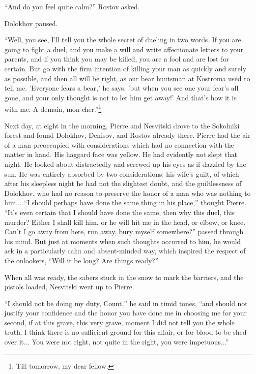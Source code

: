 ``And do you feel quite calm?'' Rostov asked.

Dolokhov paused.

``Well, you see, I'll tell you the whole secret of dueling in two
words.  If you are going to fight a duel, and you make a will and
write affectionate letters to your parents, and if you think you
may be killed, you are a fool and are lost for certain. But go
with the firm intention of killing your man as quickly and surely
as possible, and then all will be right, as our bear huntsman at
Kostroma used to tell me. 'Everyone fears a bear,' he says, 'but
when you see one your fear's all gone, and your only thought is
not to let him get away!' And that's how it is with me. A demain,
mon cher.''\footnote{Till tomorrow, my dear fellow.}

Next day, at eight in the morning, Pierre and Nesvitski drove to
the Sokolniki forest and found Dolokhov, Denisov, and Rostov
already there.  Pierre had the air of a man preoccupied with
considerations which had no connection with the matter in
hand. His haggard face was yellow. He had evidently not slept
that night. He looked about distractedly and screwed up his eyes
as if dazzled by the sun. He was entirely absorbed by two
considerations: his wife's guilt, of which after his sleepless
night he had not the slightest doubt, and the guiltlessness of
Dolokhov, who had no reason to preserve the honor of a man who
was nothing to him... ``I should perhaps have done the same thing
in his place,'' thought Pierre.  ``It's even certain that I
should have done the same, then why this duel, this murder?
Either I shall kill him, or he will hit me in the head, or elbow,
or knee. Can't I go away from here, run away, bury myself
somewhere?'' passed through his mind. But just at moments when
such thoughts occurred to him, he would ask in a particularly
calm and absent-minded way, which inspired the respect of the
onlookers, ``Will it be long? Are things ready?''

When all was ready, the sabers stuck in the snow to mark the
barriers, and the pistols loaded, Nesvitski went up to Pierre.

``I should not be doing my duty, Count,'' he said in timid tones,
``and should not justify your confidence and the honor you have
done me in choosing me for your second, if at this grave, this
very grave, moment I did not tell you the whole truth. I think
there is no sufficient ground for this affair, or for blood to be
shed over it... You were not right, not quite in the right, you
were impetuous...''

